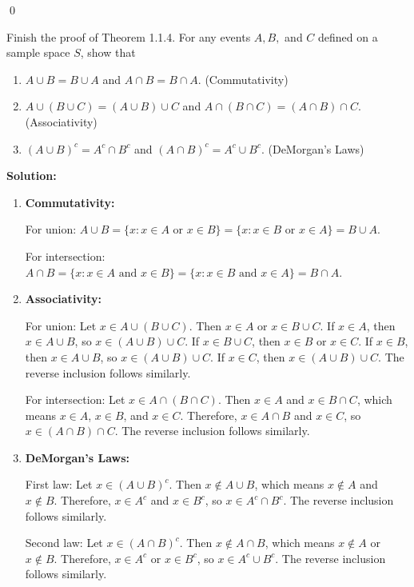 \qed
\begin{problembox}
Finish the proof of Theorem 1.1.4. For any events $A, B,$ and $C$ defined on a sample space $S$, show that
\begin{enumerate}[label=(\alph*)]
    \item $A \cup B = B \cup A$ and $A \cap B = B \cap A$. (Commutativity)
    \item $A \cup (B \cup C) = (A \cup B) \cup C$ and $A \cap (B \cap C) = (A \cap B) \cap C$. (Associativity)
    \item $(A \cup B)^c = A^c \cap B^c$ and $(A \cap B)^c = A^c \cup B^c$. (DeMorgan's Laws)
\end{enumerate}\end{problembox}

\noindent\textbf{Solution:}
\begin{enumerate}[label=(\alph*)]
    \item \textbf{Commutativity:}
    
    For union: $A \cup B = \{x : x \in A \text{ or } x \in B\} = \{x : x \in B \text{ or } x \in A\} = B \cup A$.
    
    For intersection: $A \cap B = \{x : x \in A \text{ and } x \in B\} = \{x : x \in B \text{ and } x \in A\} = B \cap A$.
    
    \item \textbf{Associativity:}
    
    For union: Let $x \in A \cup (B \cup C)$. Then $x \in A$ or $x \in B \cup C$. If $x \in A$, then $x \in A \cup B$, so $x \in (A \cup B) \cup C$. If $x \in B \cup C$, then $x \in B$ or $x \in C$. If $x \in B$, then $x \in A \cup B$, so $x \in (A \cup B) \cup C$. If $x \in C$, then $x \in (A \cup B) \cup C$. The reverse inclusion follows similarly.
    
    For intersection: Let $x \in A \cap (B \cap C)$. Then $x \in A$ and $x \in B \cap C$, which means $x \in A$, $x \in B$, and $x \in C$. Therefore, $x \in A \cap B$ and $x \in C$, so $x \in (A \cap B) \cap C$. The reverse inclusion follows similarly.
    
    \item \textbf{DeMorgan's Laws:}
    
    First law: Let $x \in (A \cup B)^c$. Then $x \notin A \cup B$, which means $x \notin A$ and $x \notin B$. Therefore, $x \in A^c$ and $x \in B^c$, so $x \in A^c \cap B^c$. The reverse inclusion follows similarly.
    
    Second law: Let $x \in (A \cap B)^c$. Then $x \notin A \cap B$, which means $x \notin A$ or $x \notin B$. Therefore, $x \in A^c$ or $x \in B^c$, so $x \in A^c \cup B^c$. The reverse inclusion follows similarly.
\end{enumerate}



